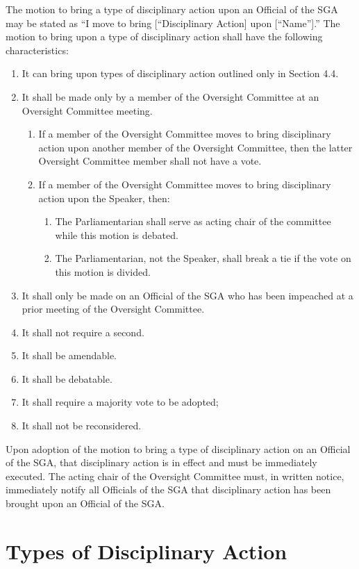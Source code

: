 \documentclass[12pt]{scrreprt}
\begin{document}
The motion to bring a type of disciplinary action upon an Official of the SGA may be stated as “I move to
bring [“Disciplinary Action] upon [“Name”].” The motion to bring upon a type of disciplinary action
shall have the following characteristics:
\begin{enumerate}
    \item It can bring upon types of disciplinary action outlined only in Section 4.4.
    \item It shall be made only by a member of the Oversight Committee at an Oversight Committee
meeting.
    \begin{enumerate}
        \item If a member of the Oversight Committee moves to bring disciplinary action upon another
member of the Oversight Committee, then the latter Oversight Committee member shall
not have a vote.
        \item If a member of the Oversight Committee moves to bring disciplinary action upon the
Speaker, then:
    \begin{enumerate}
        \item The Parliamentarian shall serve as acting chair of the committee while this motion is debated.
        \item The Parliamentarian, not the Speaker, shall break a tie if the vote on this motion is divided.
    \end{enumerate}
    \end{enumerate}
    \item It shall only be made on an Official of the SGA who has been impeached at a prior meeting of the
Oversight Committee.
    \item It shall not require a second.
    \item It shall be amendable.
    \item It shall be debatable.
    \item It shall require a majority vote to be adopted;
    \item It shall not be reconsidered.
\end{enumerate}

Upon adoption of the motion to bring a type of disciplinary action on an Official of the SGA, that
disciplinary action is in effect and must be immediately executed. The acting chair of the Oversight
Committee must, in written notice, immediately notify all Officials of the SGA that disciplinary action
has been brought upon an Official of the SGA.

\section{Types of Disciplinary Action}
\end{document}
